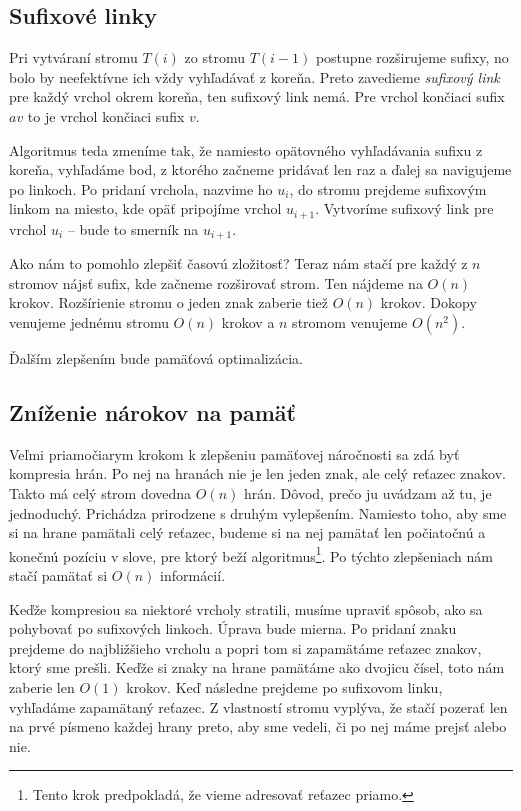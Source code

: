 \subsection{Sufixové linky}

Pri vytváraní stromu $T(i)$ zo stromu $T(i-1)$ postupne rozširujeme sufixy, no 
bolo by neefektívne ich vždy vyhľadávať z koreňa. Preto zavedieme 
\emph{sufixový link} pre každý vrchol okrem koreňa, ten sufixový link nemá. 
Pre vrchol končiaci sufix $av$ to je vrchol končiaci sufix $v$. 

Algoritmus teda zmeníme tak, že namiesto opätovného vyhľadávania sufixu z 
koreňa, vyhľadáme bod, z ktorého začneme pridávať len raz a ďalej sa 
navigujeme po linkoch. Po pridaní vrchola, nazvime ho $u_i$, do stromu 
prejdeme sufixovým linkom na miesto, kde opäť pripojíme vrchol $u_{i+1}$. 
Vytvoríme sufixový link pre vrchol $u_i$ -- bude to smerník na $u_{i+1}$. 

Ako nám to pomohlo zlepšiť časovú zložitosť? Teraz nám stačí pre každý z 
$n$ stromov nájsť sufix, kde začneme rozširovať strom. Ten nájdeme na $O(n)$ 
krokov. Rozšírienie stromu o jeden znak zaberie tiež $O(n)$ krokov. Dokopy 
venujeme jednému stromu $O(n)$ krokov a $n$ stromom venujeme $O(n^2)$.

Ďalším zlepšením bude pamäťová optimalizácia.

\subsection{Zníženie nárokov na pamäť}

Veľmi priamočiarym krokom k zlepšeniu pamäťovej náročnosti sa zdá byť 
kompresia hrán. Po nej na hranách 
nie je len jeden znak, ale celý reťazec znakov. Takto má celý strom dovedna 
$O(n)$ hrán. Dôvod, prečo ju uvádzam až tu, je jednoduchý. 
Prichádza prirodzene s druhým vylepšením. Namiesto toho, aby sme si na hrane 
pamätali celý reťazec, budeme si na nej pamätať len počiatočnú a konečnú 
pozíciu v slove, pre ktorý beží algoritmus\footnote{Tento krok predpokladá, 
že vieme adresovať reťazec priamo.}. Po týchto zlepšeniach nám stačí 
pamätať si $O(n)$ informácií. 

Keďže kompresiou sa niektoré vrcholy stratili, musíme upraviť spôsob, ako sa 
pohybovať po sufixových linkoch. Úprava bude mierna. Po pridaní znaku 
prejdeme do najbližšieho vrcholu a popri tom si zapamätáme reťazec znakov, 
ktorý sme prešli. Keďže si znaky na hrane pamätáme ako dvojicu čísel, toto 
nám zaberie len $O(1)$ krokov. Keď následne prejdeme po sufixovom linku, 
vyhľadáme zapamätaný reťazec. Z vlastností stromu vyplýva, že stačí 
pozerať len na prvé písmeno každej hrany preto, aby sme vedeli, či po nej 
máme prejsť alebo nie.

